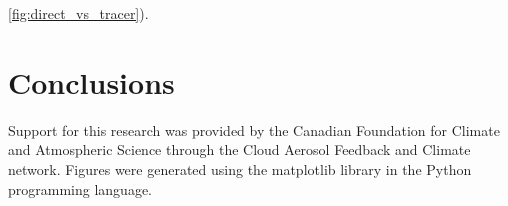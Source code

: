 \documentclass[12pt]{article}
\begin{document}
\ref{fig:direct_vs_tracer}).


\section{Conclusions}




\begin{acknowledgment}
Support for this research was provided by the Canadian Foundation for Climate 
and Atmospheric Science through the Cloud Aerosol Feedback and Climate 
network.  Figures were generated using the matplotlib library in the Python
programming language.
\end{acknowledgment}





\end{document}
